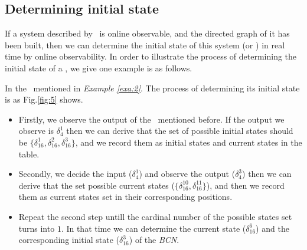 \subsection{Determining initial state}

If a system described by \BCN\ is online observable, and the directed graph of it has been built, then we can determine the initial state of this system (or \BCN) in real time by online observability. In order to illustrate the process of determining the initial state of a \BCN, we give one example is as follows.
\begin{example}
In the \BCN\ mentioned in {\em Example \ref{exa:2}}. The process of determining its initial state is as Fig.\ref{fig:5} shows. 
\begin{itemize}
  \item Firstly, we observe the output of the \BCN\ mentioned before. If the output we observe is $\delta_4^1$ then we can derive that the set of possible initial states should be $\{\delta_{16}^1,\delta_{16}^2,\delta_{16}^3\}$, and we record them as initial states and current states in the table. 
  \item Secondly, we decide the input ($\delta_4^1$) and observe the output ($\delta_4^3$) then we can derive that the set possible current states ($\{\delta_{16}^{10},\delta_{16}^{11}\}$), and then we record them as current states set in their corresponding positions. 
 \item Repeat the second step untill the cardinal number of the possible states set turns into $1$. In that time we can determine the current state ($\delta_{16}^{6}$) and the corresponding initial state  ($\delta_{16}^{3}$) of the {\em BCN}.
\end{itemize} 
\end{example}   

